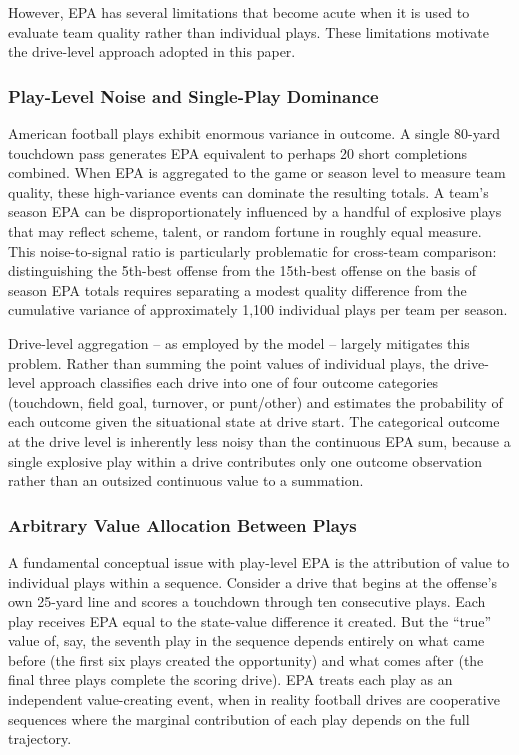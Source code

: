 However, EPA has several limitations that become acute when it is used to evaluate team quality rather than individual plays. These limitations motivate the drive-level approach adopted in this paper.

\subsubsection{Play-Level Noise and Single-Play Dominance}

American football plays exhibit enormous variance in outcome. A single 80-yard touchdown pass generates EPA equivalent to perhaps 20 short completions combined. When EPA is aggregated to the game or season level to measure team quality, these high-variance events can dominate the resulting totals. A team's season EPA can be disproportionately influenced by a handful of explosive plays that may reflect scheme, talent, or random fortune in roughly equal measure. This noise-to-signal ratio is particularly problematic for cross-team comparison: distinguishing the 5th-best offense from the 15th-best offense on the basis of season EPA totals requires separating a modest quality difference from the cumulative variance of approximately 1,100 individual plays per team per season.

Drive-level aggregation  -- as employed by the \xscore{} model  -- largely mitigates this problem. Rather than summing the point values of individual plays, the drive-level approach classifies each drive into one of four outcome categories (touchdown, field goal, turnover, or punt/other) and estimates the probability of each outcome given the situational state at drive start. The categorical outcome at the drive level is inherently less noisy than the continuous EPA sum, because a single explosive play within a drive contributes only one outcome observation rather than an outsized continuous value to a summation.

\subsubsection{Arbitrary Value Allocation Between Plays}

A fundamental conceptual issue with play-level EPA is the attribution of value to individual plays within a sequence. Consider a drive that begins at the offense's own 25-yard line and scores a touchdown through ten consecutive plays. Each play receives EPA equal to the state-value difference it created. But the ``true'' value of, say, the seventh play in the sequence depends entirely on what came before (the first six plays created the opportunity) and what comes after (the final three plays complete the scoring drive). EPA treats each play as an independent value-creating event, when in reality football drives are cooperative sequences where the marginal contribution of each play depends on the full trajectory.

